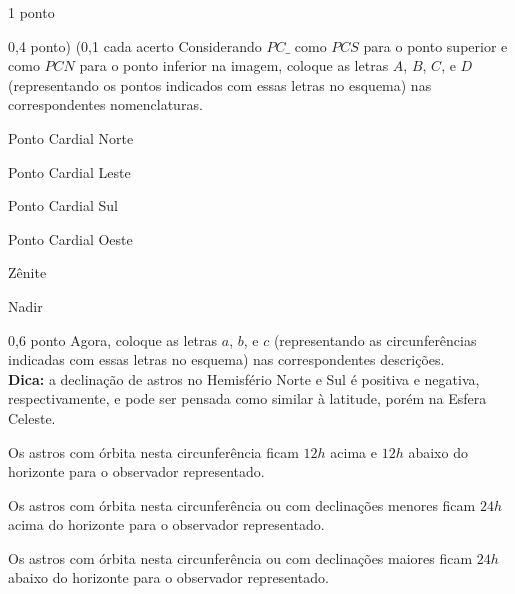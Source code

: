 \documentclass{../lista}
\begin{document}
\begin{questao}{1 ponto}
		\begin{pergunta}{0,4 ponto) (0,1 cada acerto}
			Considerando $PC\_$ como $PCS$ para o ponto superior e como $PCN$ para o ponto inferior na imagem, coloque as letras $A$, $B$, $C$, e $D$ (representando os pontos indicados com essas letras no esquema) nas correspondentes nomenclaturas.
			\begin{multicols}{3} \begin{alternativas}
				\item Ponto Cardial Norte
				\item Ponto Cardial Leste
				\item Ponto Cardial Sul
				\item Ponto Cardial Oeste
				\item Zênite
				\item Nadir
			\end{alternativas} \end{multicols}
		\end{pergunta}

		\begin{pergunta}{0,6 ponto}
			Agora, coloque as letras $a$, $b$, e $c$ (representando as circunferências indicadas com essas letras no esquema) nas correspondentes descrições. \\
			\textbf{Dica:} a declinação de astros no Hemisfério Norte e Sul é positiva e negativa, respectivamente, e pode ser pensada como similar à latitude, porém na Esfera Celeste.
			\begin{alternativas}
				\item Os astros com órbita nesta circunferência ficam $12h$ acima e $12h$ abaixo do horizonte para o observador representado.
				\item Os astros com órbita nesta circunferência ou com declinações menores ficam $24h$ acima do horizonte para o observador representado.
				\item Os astros com órbita nesta circunferência ou com declinações maiores ficam $24h$ abaixo do horizonte para o observador representado.
			\end{alternativas}
		\end{pergunta}
	\end{questao}
\end{document}
